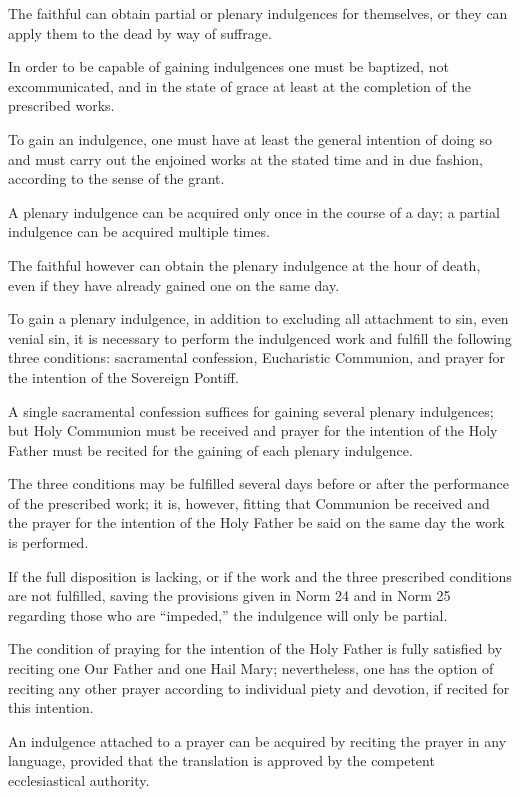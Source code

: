 \documentclass[12pt]{article}
\begin{document}
The faithful can obtain partial or plenary indulgences for themselves, or they can apply them to the dead by way of suffrage.

 In order to be capable of gaining indulgences one must be baptized, not excommunicated, and in the state of grace at least at the completion of the prescribed works.

 To gain an indulgence, one must have at least the general intention of doing so and must carry out the enjoined works at the stated time and in due fashion, according to the sense of the grant.

 A plenary indulgence can be acquired only once in the course of a day; a partial indulgence can be acquired multiple times.

 The faithful however can obtain the plenary indulgence at the hour of death, even if they have already gained one on the same day.

 To gain a plenary indulgence, in addition to excluding all attachment to sin, even venial sin, it is necessary to perform the indulgenced work and fulfill the following three conditions:
sacramental confession, Eucharistic Communion, and prayer for the intention of the Sovereign Pontiff.

 A single sacramental confession suffices for gaining several plenary indulgences;
but Holy Communion must be received and prayer for the intention of the Holy Father must be recited for the gaining of each plenary indulgence.

 The three conditions may be fulfilled several days before or after the performance of the prescribed work;
it is, however, fitting that Communion be received and the prayer for the intention of the Holy Father be said on the same day the work is performed.

 If the full disposition is lacking, or if the work and the three prescribed conditions are not fulfilled, saving the provisions given in Norm 24 and in Norm 25 regarding those who are ``impeded,'' the indulgence will only be partial.

 The condition of praying for the intention of the Holy Father is fully satisfied by reciting one Our Father and one Hail Mary;
nevertheless, one has the option of reciting any other prayer according to individual piety and devotion, if recited for this intention.

 An indulgence attached to a prayer can be acquired by reciting the prayer in any language, provided that the translation is approved by the competent ecclesiastical authority.
\end{document}
